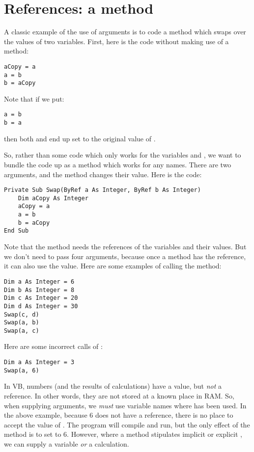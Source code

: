 	\section{References: a  method}
		A classic example of the use of arguments is to code a method which swaps over the values of two variables. First, here is the code without making use of a method:
		\begin{lstlisting}
aCopy = a
a = b
b = aCopy
		\end{lstlisting}
		Note that if we put:
		\begin{lstlisting}
a = b
b = a
		\end{lstlisting}
		then both  and  end up set to the original value of .
		
		So, rather than some code which only works for the variables  and , we want to bundle the code up as a method which works for any names. There are two arguments, and the method changes their value. Here is the code:
		\begin{lstlisting}
Private Sub Swap(ByRef a As Integer, ByRef b As Integer)
	Dim aCopy As Integer
	aCopy = a
	a = b
	b = aCopy
End Sub
		\end{lstlisting}
		Note that the method needs the references of the variables and their values. But we don't need to pass four arguments, because once a method has the reference, it can also use the value. Here are some examples of calling the  method:
		\begin{lstlisting}
Dim a As Integer = 6
Dim b As Integer = 8
Dim c As Integer = 20
Dim d As Integer = 30
Swap(c, d)
Swap(a, b)
Swap(a, c)
		\end{lstlisting}
		Here are some incorrect calls of :
		\begin{lstlisting}
Dim a As Integer = 3
Swap(a, 6)
		\end{lstlisting}
		
		In VB, numbers (and the results of calculations) have a value, but \emph{not} a reference. In other words, they are not stored at a known place in RAM. So, when supplying arguments, we \emph{must} use variable names where  has been used. In the above example, because 6 does not have a reference, there is no place to accept the value of . The program will compile and run, but the only effect of the method is to set  to 6. However, where a method stipulates implicit or explicit , we can supply a variable \emph{or} a calculation.


